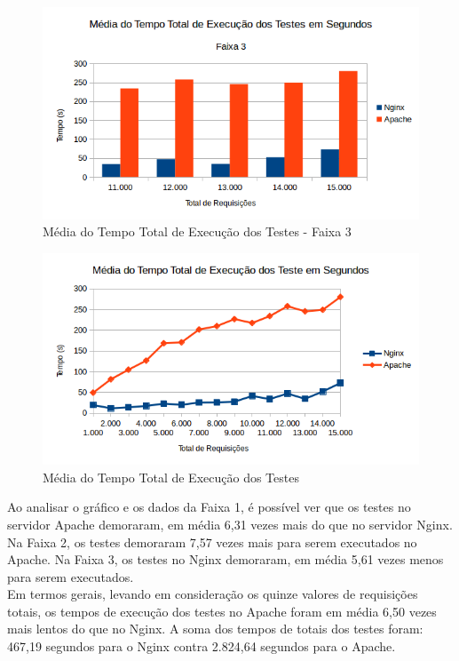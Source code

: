 \begin{figure}[H]
	\centering
	\includegraphics[width=1\linewidth]{graficos/grafico1-f3} 
	\caption{Média do Tempo Total de Execução dos Testes - Faixa 3}
	\label{fig:grafico1-f3}
\end{figure}
\begin{figure}[H]
	\centering
	\includegraphics[width=1\linewidth]{graficos/grafico1} 
	\caption{Média do Tempo Total de Execução dos Testes}
	\label{fig:grafico1}
\end{figure}
Ao analisar o gráfico e os dados da Faixa 1, é possível ver que os testes no 
servidor Apache demoraram, em média 6,31 vezes mais do que no servidor Nginx. 
Na Faixa 2, os testes demoraram 7,57 vezes mais para serem executados no 
Apache. Na Faixa 3, os testes no Nginx demoraram, em média 5,61 vezes menos 
para serem executados.\\
Em termos gerais, levando em consideração os quinze valores de requisições 
totais, os tempos de execução dos testes no Apache foram em média 6,50 vezes 
mais lentos do que no Nginx. A soma dos tempos de totais dos testes foram: 
467,19 segundos para o Nginx contra 2.824,64 segundos para o Apache.
